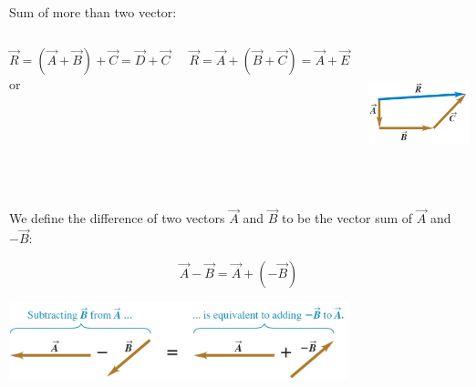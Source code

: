 \documentclass[]{beamer}
\begin{document}
\begin{frame}

  Sum of more than two vector:
  
  
  
  
     \begin{columns}[c]
     \column{2in}  %
    
  
  \begin{equation*}
  \vec{R}=(\vec{A}+\vec{B})+\vec{C}=\vec{D}+\vec{C}
  \end{equation*}
  or
  
  \begin{equation*}
  \vec{R}=\vec{A}+(\vec{B}+\vec{C})=\vec{A}+\vec{E}
  \end{equation*}
  
  
  
     \column{2in}
  
  
  
  
    \begin{center}
    \includegraphics[height=1.5in]{images/sum_of_more_vec.jpg}
  \end{center}
  
  
     \end{columns}
  
  
  
  \end{frame}




\begin{frame}

  We define the difference of two vectors $\vec{A}$ and $\vec{B}$ to be the vector sum of $\vec{A}$ and $-\vec{B}$:
 
 
 \begin{equation*}
 \vec{A}-\vec{B}=\vec{A}+(-\vec{B})
 \end{equation*}
 
 \vspace{5mm}
 
  \begin{center}
   \includegraphics[height=0.9in]{images/subs_vecs.jpg}
 \end{center}
 
 
 
 \end{frame}
 
\end{document}
